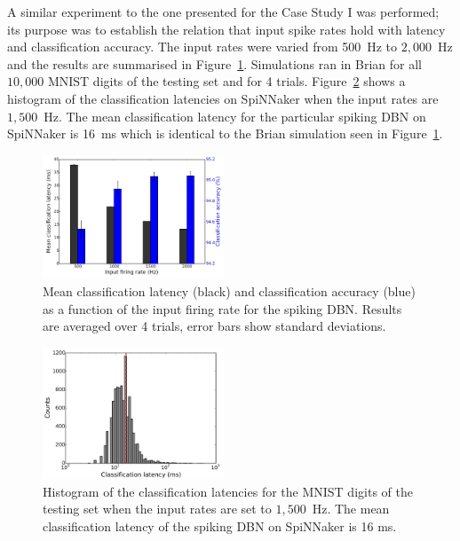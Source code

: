 \documentclass{frontiersENG} %
\begin{document}
A similar experiment to the one presented for the Case Study I was performed; its purpose was to establish the relation that input spike rates hold with latency and classification accuracy.
The input rates were varied from 500~Hz to $2,000$~Hz and the results are summarised in Figure~\ref{Fig:brianLatency}. Simulations ran in Brian for all $10,000$ MNIST digits of the testing set and for 4 trials. Figure~\ref{Fig:spinnLatency1500hz} shows a histogram of the classification latencies on SpiNNaker when the input rates are $1,500$~Hz. The mean classification latency for the particular spiking DBN on SpiNNaker is 16~ms which is identical to the Brian simulation seen in Figure~\ref{Fig:brianLatency}.


\begin{figure}[hbt!]
	\centering
	\includegraphics[width=0.48\textwidth]{fig10}
	\caption{Mean classification latency (black) and classification accuracy (blue) as a function of the input firing rate for the spiking DBN. Results are averaged over 4 trials, error bars show standard deviations.}
	\label{Fig:brianLatency}
\end{figure} 



\begin{figure}[hbt!]
	\centering
	\includegraphics[width=0.48\textwidth]{fig11}
	\caption{Histogram of the classification latencies for the MNIST digits of the testing set when the input rates are set to $1,500$~Hz. The mean classification latency of the spiking DBN on SpiNNaker is 16 ms.}
	\label{Fig:spinnLatency1500hz}
\end{figure} 
\end{document}

